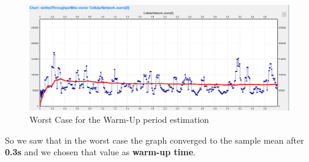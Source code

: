 \begin{figure}[H]
  \includegraphics[width=1\textwidth]{images/binomial_user0_rate9_6_rep9}
  \caption{Worst Case for the Warm-Up period estimation}
  \label{fig:warm_up time}
\end{figure}

So we saw that in the worst case the graph converged to the sample mean after \textbf{0.3s} and we chosen that value as \textbf{warm-up time}. 